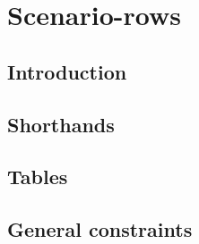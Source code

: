 \section{Scenario-rows \lispTodo{}}
\subsection{Introduction}                      \label{hub: scenarios: intro}           
\subsection{Shorthands          \lispWip{}}    \label{hub: scenarios: shorthands}      
\subsection{Tables}                            \label{hub: scenarios: tables}          
\subsection{General constraints \lispWip{}}    \label{hub: scenarios: generalities}    
